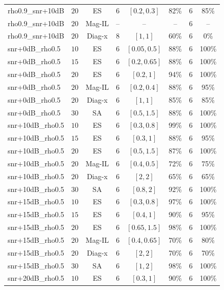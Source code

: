 \begin{longtable}{@{}lccccccc@{}}
rho0.9\_snr+10dB & \(20\) & ES & \(6\) & \([0.2, 0.3]\) & 82\% & \(6\) & 85\% \\
rho0.9\_snr+10dB & \(20\) & Mag-IL & -- & -- & -- & \(6\) & -- \\
rho0.9\_snr+10dB & \(20\) & Diag-x & \(8\) & \([1, 1]\) & 60\% & \(6\) & 0\% \\
snr+0dB\_rho0.5 & \(10\) & ES & \(6\) & \([0.05, 0.5]\) & 88\% & \(6\) & 100\% \\
snr+0dB\_rho0.5 & \(15\) & ES & \(6\) & \([0.2, 0.65]\) & 88\% & \(6\) & 100\% \\
snr+0dB\_rho0.5 & \(20\) & ES & \(6\) & \([0.2, 1]\) & 94\% & \(6\) & 100\% \\
snr+0dB\_rho0.5 & \(20\) & Mag-IL & \(6\) & \([0.2, 0.4]\) & 88\% & \(6\) & 95\% \\
snr+0dB\_rho0.5 & \(20\) & Diag-x & \(6\) & \([1, 1]\) & 85\% & \(6\) & 85\% \\
snr+0dB\_rho0.5 & \(30\) & SA & \(6\) & \([0.5, 1.5]\) & 88\% & \(6\) & 100\% \\
snr+10dB\_rho0.5 & \(10\) & ES & \(6\) & \([0.3, 0.8]\) & 99\% & \(6\) & 100\% \\
snr+10dB\_rho0.5 & \(15\) & ES & \(6\) & \([0.3, 1]\) & 88\% & \(6\) & 95\% \\
snr+10dB\_rho0.5 & \(20\) & ES & \(6\) & \([0.5, 1.5]\) & 87\% & \(6\) & 100\% \\
snr+10dB\_rho0.5 & \(20\) & Mag-IL & \(6\) & \([0.4, 0.5]\) & 72\% & \(6\) & 75\% \\
snr+10dB\_rho0.5 & \(20\) & Diag-x & \(6\) & \([2, 2]\) & 65\% & \(6\) & 65\% \\
snr+10dB\_rho0.5 & \(30\) & SA & \(6\) & \([0.8, 2]\) & 92\% & \(6\) & 100\% \\
snr+15dB\_rho0.5 & \(10\) & ES & \(6\) & \([0.3, 0.8]\) & 97\% & \(6\) & 100\% \\
snr+15dB\_rho0.5 & \(15\) & ES & \(6\) & \([0.4, 1]\) & 90\% & \(6\) & 95\% \\
snr+15dB\_rho0.5 & \(20\) & ES & \(6\) & \([0.65, 1.5]\) & 98\% & \(6\) & 100\% \\
snr+15dB\_rho0.5 & \(20\) & Mag-IL & \(6\) & \([0.4, 0.65]\) & 70\% & \(6\) & 80\% \\
snr+15dB\_rho0.5 & \(20\) & Diag-x & \(6\) & \([2, 2]\) & 70\% & \(6\) & 70\% \\
snr+15dB\_rho0.5 & \(30\) & SA & \(6\) & \([1, 2]\) & 98\% & \(6\) & 100\% \\
snr+20dB\_rho0.5 & \(10\) & ES & \(6\) & \([0.3, 1]\) & 90\% & \(6\) & 100\% \\

\end{longtable}
